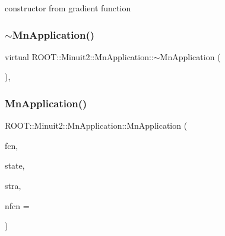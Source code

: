 constructor from gradient function 

\mbox{\label{classROOT_1_1Minuit2_1_1MnApplication_ab8f38ab869bbfe082a2dbcefe1fb19de}} 
\subsubsection{\texorpdfstring{$\sim$MnApplication()}{~MnApplication()}\hspace{0.1cm}{\footnotesize\ttfamily [1/3]}}
{\footnotesize\ttfamily virtual R\+O\+O\+T\+::\+Minuit2\+::\+Mn\+Application\+::$\sim$\+Mn\+Application (\begin{DoxyParamCaption}{ }\end{DoxyParamCaption})\hspace{0.3cm}{\ttfamily [inline]}, {\ttfamily [virtual]}}

\mbox{\label{classROOT_1_1Minuit2_1_1MnApplication_ac3bea3d025068f8bc7d8a6701f23aa81}} 
\subsubsection{\texorpdfstring{MnApplication()}{MnApplication()}\hspace{0.1cm}{\footnotesize\ttfamily [3/6]}}
{\footnotesize\ttfamily R\+O\+O\+T\+::\+Minuit2\+::\+Mn\+Application\+::\+Mn\+Application (\begin{DoxyParamCaption}\item[{const \mbox{\hyperlink{classROOT_1_1Minuit2_1_1FCNBase}{F\+C\+N\+Base}} \&}]{fcn,  }\item[{const \mbox{\hyperlink{classROOT_1_1Minuit2_1_1MnUserParameterState}{Mn\+User\+Parameter\+State}} \&}]{state,  }\item[{const \mbox{\hyperlink{classROOT_1_1Minuit2_1_1MnStrategy}{Mn\+Strategy}} \&}]{stra,  }\item[{unsigned int}]{nfcn = {} }\end{DoxyParamCaption})}



